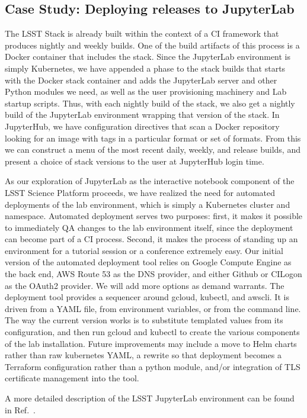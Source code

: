 \subsection{Case Study: Deploying releases to JupyterLab}
\label{sec:jupyterlab}

The LSST Stack is already built within the context of a CI framework
that produces nightly and weekly builds.  One of the build artifacts of
this process is a Docker container that includes the stack.  Since the
JupyterLab environment is simply Kubernetes, we have appended a phase to
the stack builds that starts with the Docker stack container and adds
the JupyterLab server and other Python modules we need, as well as the
user provisioning machinery and Lab startup scripts.  Thus, with each
nightly build of the stack, we also get a nightly build of the
JupyterLab environment wrapping that version of the stack.  In
JupyterHub, we have configuration directives that scan a Docker
repository looking for an image with tags in a particular format or set
of formats.  From this we can construct a menu of the most recent daily,
weekly, and release builds, and present a choice of stack versions to
the user at JupyterHub login time.

As our exploration of JupyterLab as the interactive notebook component
of the LSST Science Platform\cite{LSE-319} proceeds, we have realized the need for
automated deployments of the lab environment, which is simply a
Kubernetes cluster and namespace.  Automated deployment serves two
purposes: first, it makes it possible to immediately QA changes to the
lab environment itself, since the deployment can become part of a CI
process.  Second, it makes the process of standing up an environment for
a tutorial session or a conference extremely easy.  Our initial version
of the automated deployment tool relies on Google Compute Engine as the
back end, AWS Route 53 as the DNS provider, and either Github or CILogon
as the OAuth2 provider.  We will add more options as demand warrants.
The deployment tool provides a sequencer around gcloud, kubectl, and
awscli.  It is driven from a YAML file, from environment variables, or
from the command line.  The way the current version works is to
substitute templated values from its configuration, and then run gcloud
and kubectl to create the various components of the lab installation.
Future improvements may include a move to Helm charts rather than raw
kubernetes YAML, a rewrite so that deployment becomes a Terraform
configuration rather than a python module, and/or integration of TLS
certificate management into the tool.

A more detailed description of the LSST JupyterLab environment can be found in Ref.~.
